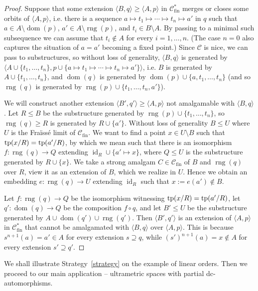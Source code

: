 \documentclass[10pt,a4paper]{article}
\theoremstyle{definition}
\theoremstyle{remark}
\newcommand \seq [1]{\langle #1 \rangle}
\newcommand \maps {\colon} %
\newcommand \id [1]{{\operatorname{id}_{#1}}}
\newcommand \dom {\operatorname{dom}}
\newcommand \rng {\operatorname{rng}}
\newcommand \cmp {\circ} %
\newcommand \C {\mathscr{C}}
\newcommand \fin {{\operatorname{fin}}}
\newcommand \tp {{\rm{tp}}}
\begin{document}
\begin{proof}
    Suppose that some extension $\seq{B, q} \geq \seq{A, p}$ in $\C^*_\fin$ merges or closes some orbits of $\seq{A, p}$, i.e. there is a sequence $a \mapsto t_1 \mapsto \cdots \mapsto t_n \mapsto a'$ in $q$ such that $a \in A \setminus \dom(p)$, $a' \in A \setminus \rng(p)$, and $t_i \in B \setminus A$.
    By passing to a minimal such subsequence we can assume that $t_i \notin A$ for every $i = 1, \ldots, n$.
    (The case $n = 0$ also captures the situation of $a = a'$ becoming a fixed point.)
    Since $\C$ is nice, we can pass to substructures, so without loss of generality, $\seq{B, q}$ is generated by $\seq{A \cup \{t_1, \ldots, t_n\}, p \cup \{a \mapsto t_1 \mapsto \cdots \mapsto t_n \mapsto a'\}}$, i.e. $B$ is generated by $A \cup \{t_1, \ldots, t_n\}$, and $\dom(q)$ is generated by $\dom(p) \cup \{a, t_1, \ldots, t_n\}$ (and so  $\rng(q)$ is generated by $\rng(p) \cup \{t_1, \ldots, t_n, a'\}$).

    We will construct another extension $\seq{B', q'} \geq \seq{A, p}$ not amalgamable with $\seq{B, q}$.
    Let $R \leq B$ be the substructure generated by $\rng(p) \cup \{t_1, \ldots, t_n\}$, so $\rng(q) \geq R$ is generated by $R \cup \{a'\}$.
    Without loss of generality $B\leq U$ where $U$ is the Fraïssé limit of $\C_\fin$.
    We want to find a point $x \in U \setminus B$ such that $\tp(x/R) = \tp(a'/R)$, by which we mean such that there is an isomorphism $f\maps\rng(q) \to Q$ extending $\id{R} \cup \{a' \mapsto x\}$, where $Q \leq U$ is the substructure generated by $R \cup \{x\}$.
    We take a strong amalgam $C \in \C_\fin$ of $B$ and $\rng(q)$ over $R$, view it as an extension of $B$, which we realize in $U$.
    Hence we obtain an embedding $e\maps\rng(q) \to U$ extending $\id{R}$ such that $x := e(a') \notin B$.
    
    Let $f\maps \rng(q) \to Q$ be the isomorphism witnessing $\tp(x/R) = \tp(a'/R)$, let $q'\maps \dom(q) \to Q$ be the composition $f \cmp q$, and let $B' \leq U$ be the substructure generated by $A \cup \dom(q') \cup \rng(q')$.
    Then $\seq{B', q'}$ is an extension of $\seq{A, p}$ in $\C^*_\fin$ that cannot be amalgamated with $\seq{B, q}$ over $\seq{A, p}$.
    This is because $s^{n + 1}(a) =a' \in A$ for every extension $s \supseteq q$, while $(s')^{n+1}(a)=x \not \in A$ for every extension $s' \supseteq q'$.
\end{proof}

We shall illustrate Strategy~\ref{strategy} on the example of linear orders.
Then we proceed to our main application – ultrametric spaces with partial dc-automorphisms.
\end{document}
